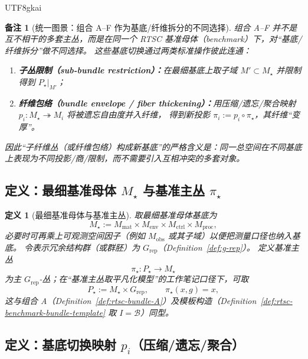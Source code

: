 \documentclass[12pt]{article}
\newtheorem{definition}{定义}[section]
\newtheorem{remark}{备注}[section]
\newcommand{\RTSC}{\textsf{RTSC}}
\begin{document}
\begin{CJK*}{UTF8}{gkai}
\begin{remark}[统一图景：组合 A--F 作为基底/纤维拆分的不同选择]
组合 A--F 并不是互不相干的多套主丛，而是在同一个 \RTSC{} 基准母体（benchmark）下，对“基底/纤维拆分”做不同选择。
这些基底切换通过两类标准操作彼此连通：
\begin{enumerate}
  \item \textbf{子丛限制（sub-bundle restriction）：}在最细基底上取子域 $M'\subset M_\star$ 并限制得到 $P_\star|_{M'}$；
  \item \textbf{纤维包络（bundle envelope / fiber thickening）：}用压缩/遗忘/聚合映射 $p_i:M_\star\twoheadrightarrow M_i$ 将被遗忘自由度并入纤维，
    得到新投影 $\pi_i:=p_i\circ\pi_\star$，其纤维“变厚”。
\end{enumerate}
因此“子纤维丛（或纤维包络）构成新基底”的严格含义是：同一总空间在不同基底上表现为不同投影/商/限制，而不需要引入互相冲突的多套对象。
\end{remark}

\subsection{定义：最细基准母体 $M_\star$ 与基准主丛 $\pi_\star$}

\begin{definition}[最细基准母体与基准主丛]
\label{def:rtsc-finest-benchmark-bundle}
取最细基准母体基底为
\[
M_\star
:=
M_{\mathrm{mat}}\times M_{\mathrm{env}}\times M_{\mathrm{ctrl}}\times M_{\mathrm{proc}},
\]
必要时可再乘上可观测空间因子（例如 $M_{\mathrm{obs}}$ 或其子域）以便把测量口径也纳入基底。
令表示冗余结构群（或群胚）为 $G_{\mathrm{rep}}$（Definition~\ref{def:g-rep}）。
定义基准主丛
\[
\pi_\star:P_\star\to M_\star
\]
为主 $G_{\mathrm{rep}}$-丛；在“基准主丛取平凡化模型”的工作笔记口径下，可取
\[
P_\star:=M_\star\times G_{\mathrm{rep}},
\qquad
\pi_\star(x,g)=x,
\]
这与组合 A（Definition~\ref{def:rtsc-bundle-A}）及模板构造（Definition~\ref{def:rtsc-benchmark-bundle-template} 取 $I=\mathcal{B}$）同型。

\end{definition}

\subsection{定义：基底切换映射 $p_i$（压缩/遗忘/聚合）}


\end{CJK*}
\end{document}
